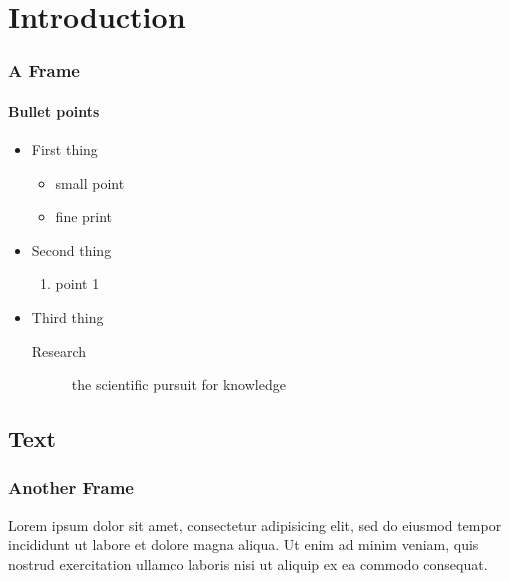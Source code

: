 \documentclass{beamer}
\author{A, B \& C}
\title{\fontsize{13}{15}{\selectfont\textbf{An illustration of the University of Stirling Beamer Template}}}
\institute{University of Stirling}
\date{\today}
\begin{document}
\begin{frame}

\titlepage
\end{frame}

\section{Introduction}
\begin{frame}
\frametitle{A Frame}
\framesubtitle{Bullet points}
\begin{itemize}
\item First thing
	\begin{itemize}
	\item small point
	\item fine print
	\end{itemize}
\item Second thing
	\begin{enumerate}
	\item point 1
	\end{enumerate}
\item Third thing
	\begin{description}
	\item[Research] the scientific pursuit for knowledge
	\end{description}
\end{itemize}
\end{frame}

\subsection{Text}
\begin{frame}
\frametitle{Another Frame}
Lorem ipsum dolor sit amet, consectetur adipisicing elit, sed do eiusmod tempor incididunt ut labore et dolore magna aliqua. Ut enim ad minim veniam, quis nostrud exercitation ullamco laboris nisi ut aliquip ex ea commodo consequat.
\end{frame}
\end{document}
